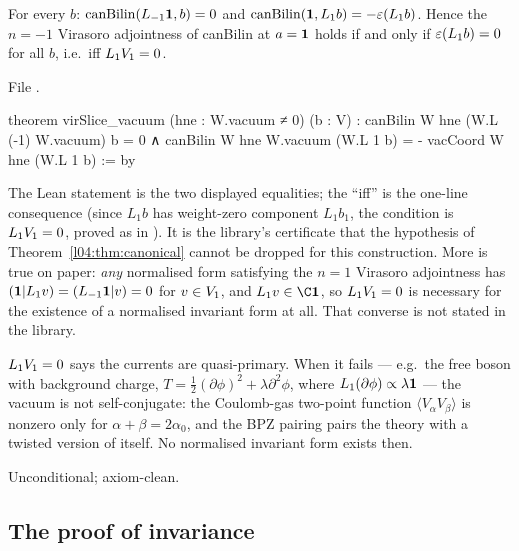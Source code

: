 \begin{theorem}[Why $L_1\lfourV_1 = 0$ is needed]\label{l04:thm:virslice}
For every $b$: $\mathrm{canBilin}(L_{-1}\mathbf{1},b) = 0$ and
$\mathrm{canBilin}(\mathbf{1},L_1b) = -\varepsilon(L_1b)$. Hence the $n = -1$ Virasoro adjointness of canBilin at
$a = \mathbf{1}$ holds if and only if $\varepsilon(L_1b) = 0$ for all $b$, i.e.\ iff $L_1\lfourV_1 = 0$.
\end{theorem}
\noindent File .
\begin{leancode}
theorem virSlice_vacuum (hne : W.vacuum ≠ 0) (b : V) :
    canBilin W hne (W.L (-1) W.vacuum) b = 0
      ∧ canBilin W hne W.vacuum (W.L 1 b) = - vacCoord W hne (W.L 1 b) := by
\end{leancode}
\begin{dictionary}
The Lean statement is the two displayed equalities; the ``iff'' is the one-line consequence (since
$L_1b$ has weight-zero component $L_1b_1$, the condition is $L_1\lfourV_1 = 0$, proved as
\allowbreak{}\allowbreak{}\allowbreak{} in ). It is the
library's certificate that the hypothesis  of Theorem~\ref{l04:thm:canonical} cannot be
dropped for this construction. More is true on paper: \emph{any} normalised form satisfying the
$n = 1$ Virasoro adjointness has $(\mathbf{1}|L_1v) = (L_{-1}\mathbf{1}|v) = 0$ for $v\in V_1$, and
$L_1v\in\C\lfourvac$, so $L_1\lfourV_1 = 0$ is necessary for the existence of a normalised invariant form at
all. That converse is not stated in the library.
\end{dictionary}
\begin{physics}
$L_1\lfourV_1 = 0$ says the currents are quasi-primary. When it fails --- e.g.\ the free boson with
background charge, $T = \tfrac12(\partial\phi)^2+\lambda\partial^2\phi$, where $L_1(\partial\phi)\propto\lambda\mathbf{1}$ ---
the vacuum is not self-conjugate: the Coulomb-gas two-point function $\langle V_\alpha V_\beta\rangle$ is
nonzero only for $\alpha+\beta = 2\alpha_0$, and the BPZ pairing pairs the theory with a twisted version
of itself. No normalised invariant form exists then.
\end{physics}
\begin{status}
Unconditional; axiom-clean.
\end{status}

\subsection{The proof of invariance}

